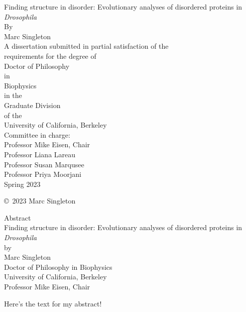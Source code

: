 \documentclass[11pt,letterpaper,oneside]{book}
\begin{document}
\begin{titlepage}
\begin{center}
    Finding structure in disorder: Evolutionary analyses of disordered proteins in \textit{Drosophila}\\
    \bigskip
    By\\
    Marc Singleton\\
    \vfill
    A dissertation submitted in partial satisfaction of the\\
    requirements for the degree of\\
    Doctor of Philosophy\\
    in\\
    Biophysics\\
    in the\\
    Graduate Division\\
    of the\\
    University of California, Berkeley\\
    \vfill
    Committee in charge:\\
    Professor Mike Eisen, Chair\\
    Professor Liana Lareau\\
    Professor Susan Marqusee\\
    Professor Priya Moorjani\\
    \bigskip
    Spring 2023\\
\end{center}
\end{titlepage}

\thispagestyle{empty}
\null  %
\vfill
\begin{center}
    \copyright \  2023 Marc Singleton
\end{center}
\clearpage

\setcounter{page}{1}  %
\begin{center}
    Abstract\\
    \bigskip
    Finding structure in disorder: Evolutionary analyses of disordered proteins in \textit{Drosophila}\\
    by\\
    Marc Singleton\\
    \bigskip
    Doctor of Philosophy in Biophysics\\
    University of California, Berkeley\\
    Professor Mike Eisen, Chair\\
    \bigskip
\end{center}
Here's the text for my abstract!
\clearpage
\end{document}
